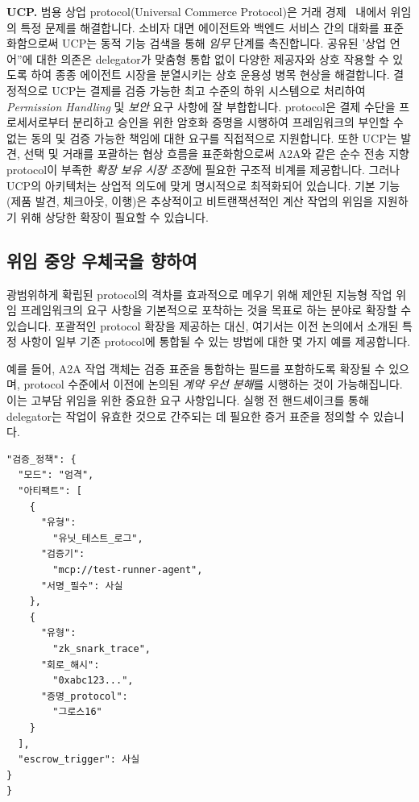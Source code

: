 \documentclass[11pt, a4paper, twocolumn, copyright, goog]{google}
\begin{document}
\textbf{UCP.} 범용 상업 protocol(Universal Commerce Protocol)은 거래 경제~\citep{handa2026ucp} 내에서 위임의 특정 문제를 해결합니다. 소비자 대면 에이전트와 백엔드 서비스 간의 대화를 표준화함으로써 UCP는 동적 기능 검색을 통해 \emph{임무} 단계를 촉진합니다. 공유된 '상업 언어''에 대한 의존은 delegator가 맞춤형 통합 없이 다양한 제공자와 상호 작용할 수 있도록 하여 종종 에이전트 시장을 분열시키는 상호 운용성 병목 현상을 해결합니다. 결정적으로 UCP는 결제를 검증 가능한 최고 수준의 하위 시스템으로 처리하여 \emph{Permission Handling} 및 \emph{보안} 요구 사항에 잘 부합합니다. protocol은 결제 수단을 프로세서로부터 분리하고 승인을 위한 암호화 증명을 시행하여 프레임워크의 부인할 수 없는 동의 및 검증 가능한 책임에 대한 요구를 직접적으로 지원합니다. 또한 UCP는 발견, 선택 및 거래를 포괄하는 협상 흐름을 표준화함으로써 A2A와 같은 순수 전송 지향 protocol이 부족한 \emph{확장 보유 시장 조정}에 필요한 구조적 비계를 제공합니다. 그러나 UCP의 아키텍처는 상업적 의도에 맞게 명시적으로 최적화되어 있습니다. 기본 기능(제품 발견, 체크아웃, 이행)은 추상적이고 비트랜잭션적인 계산 작업의 위임을 지원하기 위해 상당한 확장이 필요할 수 있습니다.

\subsection{위임 중앙 우체국을 향하여}

광범위하게 확립된 protocol의 격차를 효과적으로 메우기 위해 제안된 지능형 작업 위임 프레임워크의 요구 사항을 기본적으로 포착하는 것을 목표로 하는 분야로 확장할 수 있습니다. 포괄적인 protocol 확장을 제공하는 대신, 여기서는 이전 논의에서 소개된 특정 사항이 일부 기존 protocol에 통합될 수 있는 방법에 대한 몇 가지 예를 제공합니다.

예를 들어, A2A 작업 객체는 검증 표준을 통합하는 필드를 포함하도록 확장될 수 있으며, protocol 수준에서 이전에 논의된 \emph{계약 우선 분해}를 시행하는 것이 가능해집니다. 이는 고부담 위임을 위한 중요한 요구 사항입니다. 실행 전 핸드셰이크를 통해 delegator는 작업이 유효한 것으로 간주되는 데 필요한 증거 표준을 정의할 수 있습니다.


\begin{verbatim}
"검증_정책": {
  "모드": "엄격",
  "아티팩트": [
    {
      "유형":
        "유닛_테스트_로그",
      "검증기":
        "mcp://test-runner-agent",
      "서명_필수": 사실
    },
    {
      "유형":
        "zk_snark_trace", 
      "회로_해시":
        "0xabc123...", 
      "증명_protocol":
        "그로스16"
    }
  ],
  "escrow_trigger": 사실
}
}
\end{verbatim}
\end{document}
